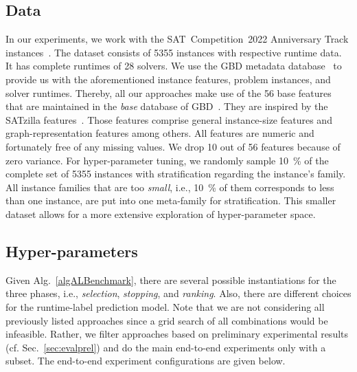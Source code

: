 \documentclass[runningheads]{llncs}
\begin{document}
\subsection{Data}
In our experiments, we work with the SAT~Competition~2022 Anniversary Track instances~\cite{sat2022}.
The dataset consists of 5355 instances with respective runtime data.
It has complete runtimes of 28 solvers.
We use the GBD metadata database~\cite{IserS18} to provide us with the aforementioned instance features, problem instances, and solver runtimes.
Thereby, all our approaches make use of the 56 base features that are maintained in the \emph{base} database of GBD~\cite{IserS18}.
They are inspired by the SATzilla features~\cite{features}.
Those features comprise general instance-size features and graph-representation features among others.
All features are numeric and fortunately free of any missing values.
We drop 10 out of 56 features because of zero variance.
For hyper-parameter tuning, we randomly sample \SI{10}{\%} of the complete set of 5355 instances with stratification regarding the instance's family.
All instance families that are too \emph{small}, i.e., \SI{10}{\%} of them corresponds to less than one instance, are put into one meta-family for stratification.
This smaller dataset allows for a more extensive exploration of hyper-parameter space.

\subsection{Hyper-parameters}
\label{sec:hyper}
Given Alg.~\ref{algALBenchmark}, there are several possible instantiations for the three phases, i.e., \emph{selection}, \emph{stopping}, and \emph{ranking}.
Also, there are different choices for the runtime-label prediction model.
Note that we are not considering all previously listed approaches since a grid search of all combinations would be infeasible.
Rather, we filter approaches based on preliminary experimental results (cf. Sec.~\ref{sec:evalprel}) and do the main end-to-end experiments only with a subset.
The end-to-end experiment configurations are given below.
\end{document}
